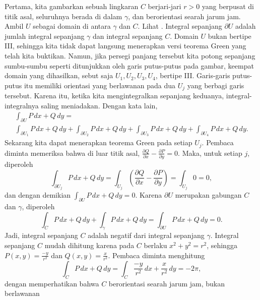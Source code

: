 \begin{example}
Pertama, kita gambarkan sebuah lingkaran $C$ berjari-jari $r > 0$ yang berpusat di
titik asal, seluruhnya berada di dalam $\gamma$, dan berorientasi searah jarum
jam. Ambil $U$ sebagai domain di antara $\gamma$ dan $C$.
Lihat .
Integral sepanjang $\partial U$ adalah jumlah integral sepanjang
$\gamma$ dan integral sepanjang $C$.
Domain $U$ bukan bertipe III\@, sehingga kita tidak dapat langsung menerapkan
versi teorema Green yang telah kita buktikan.
Namun, jika persegi panjang tersebut kita potong sepanjang sumbu-sumbu seperti
ditunjukkan oleh garis putus-putus pada gambar, keempat domain yang dihasilkan,
sebut saja $U_1,U_2,U_3,U_4$,
bertipe III\@.
Garis-garis putus-putus itu memiliki orientasi yang berlawanan
pada dua $U_j$ yang berbagi garis tersebut.
Karena itu, ketika kita mengintegralkan sepanjang keduanya,
integral-integralnya saling meniadakan. Dengan kata lain,
\begin{multline*}
\int_{\partial U} P\, dx + Q \, dy
=
\\
\int_{\partial U_1} P\, dx + Q \, dy
+
\int_{\partial U_2} P\, dx + Q \, dy
+
\int_{\partial U_3} P\, dx + Q \, dy
+
\int_{\partial U_4} P\, dx + Q \, dy .
\end{multline*}
Sekarang kita dapat menerapkan teorema Green pada setiap $U_j$.
Pembaca diminta memeriksa bahwa di luar titik asal,
$\frac{\partial Q}{\partial x} - \frac{\partial P}{\partial y} = 0$.
Maka, untuk setiap $j$, diperoleh
\begin{equation*}
\int_{\partial U_j} P\, dx + Q \, dy 
=
\int_{U_j} \left( \frac{\partial Q}{\partial x} - \frac{\partial P}{\partial
y} \right)
=
\int_{U_j} 0 = 0 ,
\end{equation*}
dan dengan demikian $\int_{\partial U} P\, dx + Q \, dy = 0$.
Karena $\partial U$ merupakan gabungan $C$ dan $\gamma$, diperoleh
\begin{equation*}
\int_C P \, dx + Q \, dy
+
\int_{\gamma} P \, dx + Q \, dy
=
\int_{\partial U} P \, dx + Q \, dy = 0 .
\end{equation*}
Jadi, integral sepanjang $C$ adalah negatif dari integral sepanjang
$\gamma$. Integral sepanjang $C$ mudah dihitung karena pada $C$ berlaku
$x^2+y^2 = r^2$, sehingga $P(x,y) = \frac{-y}{r^2}$ dan
$Q(x,y) = \frac{x}{r^2}$.
Pembaca diminta menghitung
\begin{equation*}
\int_C P\, dx + Q \, dy
=
\int_C \frac{-y}{r^2}\, dx + \frac{x}{r^2} \, dy
=
- 2 \pi ,
\end{equation*}
dengan memperhatikan bahwa $C$ berorientasi searah jarum jam, bukan berlawanan

\end{example}
